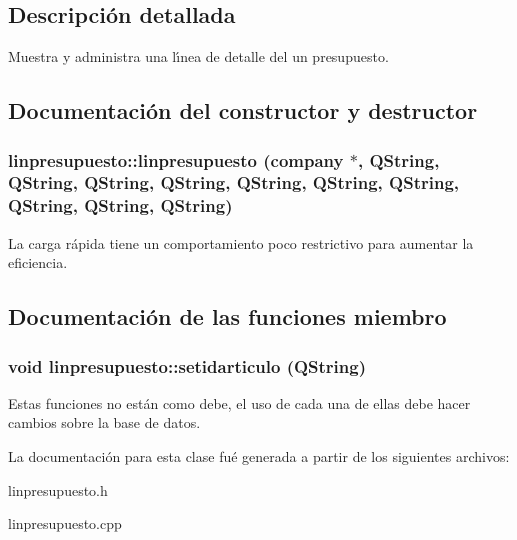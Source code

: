 \subsection{Descripci\'{o}n detallada}
Muestra y administra una l\'{\i}nea de detalle del un presupuesto. 



\subsection{Documentaci\'{o}n del constructor y destructor}
\subsubsection{\setlength{\rightskip}{0pt plus 5cm}linpresupuesto::linpresupuesto ({\bf company} $\ast$, QString, QString, QString, QString, QString, QString, QString, QString, QString, QString)}\label{classlinpresupuesto_a12}


La carga r\'{a}pida tiene un comportamiento poco restrictivo para aumentar la eficiencia. 

\subsection{Documentaci\'{o}n de las funciones miembro}
\subsubsection{\setlength{\rightskip}{0pt plus 5cm}void linpresupuesto::setidarticulo (QString)}\label{classlinpresupuesto_a22}


Estas funciones no est\'{a}n como debe, el uso de cada una de ellas debe hacer cambios sobre la base de datos. 

La documentaci\'{o}n para esta clase fu\'{e} generada a partir de los siguientes archivos:\begin{CompactItemize}
\item 
linpresupuesto.h\item 
linpresupuesto.cpp\end{CompactItemize}
